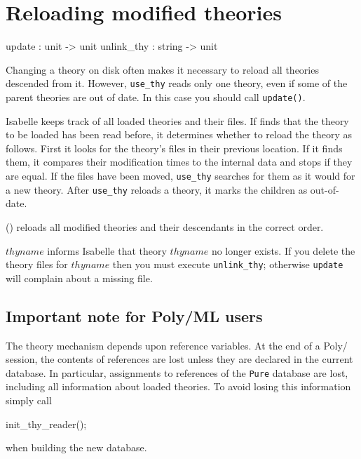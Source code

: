 \section{Reloading modified theories}\label{sec:reloading-theories}
\begin{ttbox}
update     : unit -> unit
unlink_thy : string -> unit
\end{ttbox}
Changing a theory on disk often makes it necessary to reload all theories
descended from it.  However, {\tt use_thy} reads only one theory, even if
some of the parent theories are out of date.  In this case you should call
{\tt update()}.

Isabelle keeps track of all loaded theories and their files.  If
 finds that the theory to be loaded has been read before,
it determines whether to reload the theory as follows.  First it looks for
the theory's files in their previous location.  If it finds them, it
compares their modification times to the internal data and stops if they
are equal.  If the files have been moved, {\tt use_thy} searches for them
as it would for a new theory.  After {\tt use_thy} reloads a theory, it
marks the children as out-of-date.

\begin{ttdescription}
\item[\ttindexbold{update}()]
  reloads all modified theories and their descendants in the correct order.

\item[\ttindexbold{unlink_thy} $thyname$]
  informs Isabelle that theory $thyname$ no longer exists.  If you delete the
  theory files for $thyname$ then you must execute {\tt unlink_thy};
  otherwise {\tt update} will complain about a missing file.
\end{ttdescription}


\goodbreak
\subsection{Important note for Poly/ML users}
The theory mechanism depends upon reference variables.  At the end of a
Poly/\ML{} session, the contents of references are lost unless they are
declared in the current database.  In particular, assignments to references
of the {\tt Pure} database are lost, including all information about loaded
theories. To avoid losing this information simply call
\begin{ttbox}
init_thy_reader();
\end{ttbox}
when building the new database.



